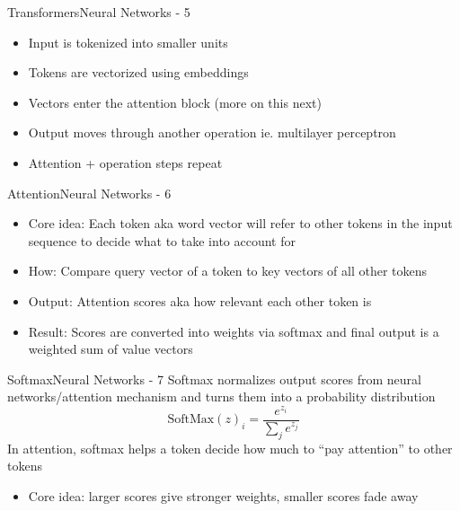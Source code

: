 \documentclass{beamer}
\begin{document}
		\begin{frame}{Transformers}{Neural Networks - 5}
			\begin{itemize}
				\item Input is tokenized into smaller units
				\item Tokens are vectorized using embeddings
				\item Vectors enter the attention block (more on this next)
				\item Output moves through another operation ie. multilayer perceptron
				\item Attention + operation steps repeat 
			\end{itemize}
		\end{frame}

		\begin{frame}{Attention}{Neural Networks - 6}
			\begin{itemize}
				\item Core idea: Each token aka word vector will refer to other tokens in the input sequence to decide what to take into account for
				\item How: Compare query vector of a token to key vectors of all other tokens
				\item Output: Attention scores aka how relevant each other token is
				\item Result: Scores are converted into weights via softmax and final output is a weighted sum of value vectors
			\end{itemize}
		\end{frame}

		\begin{frame}{Softmax}{Neural Networks - 7}
			Softmax normalizes output scores from neural networks/attention mechanism and turns them into a probability distribution      
			\[\text{SoftMax}(z)_i = \frac{e^{z_i}}{\sum_j e^{z_j}}\]
			In attention, softmax helps a token decide how much to “pay attention” to other tokens
			\begin{itemize}
				\item Core idea: larger scores give stronger weights, smaller scores fade away
			\end{itemize}
		\end{frame}
\end{document}
